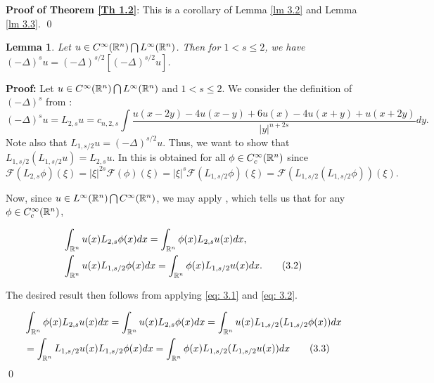 \documentclass{article}
\newtheorem{lemma}[theorem]{Lemma}
\newcommand{\rev}[1]{\textcolor{blue}{#1}}
\begin{document}
\noindent
\textbf{Proof of Theorem \ref{Th 1.2}}: This is a corollary of Lemma \ref{lm 3.2} and Lemma \ref{lm 3.3}. \qed

\begin{lemma}
\label{lm 3.1}
Let $u \in C^\infty(\mathbb{R}^n) \bigcap L^\infty(\mathbb{R}^n)$. Then for $ 1<s\le2$, we have $(-\Delta)^s u = (-\Delta)^{s/2} [(-\Delta)^{s/2}u]$.
\end{lemma}

\noindent
\textbf{Proof:} Let $u \in C^\infty(\mathbb{R}^n) \bigcap L^\infty(\mathbb{R}^n)$ and $1<s\le2$. We consider the definition of $(-\Delta)^s$ from \cite{powers}:
$$ (-\Delta)^s u = L_{2,s}u  =  c_{n,2,s}\int \frac{u(x-2y)-4u(x-y)+6u(x)-4u(x+y)+u(x+2y)}{|y|^{n+2s}}dy.$$
Note also that $L_{1,s/2}u = (-\Delta)^{s/2}u$. Thus, we want to show that  $L_{1,s/2}(L_{1,s/2}u) = L_{2, s}u$. In \cite[Thm 1.9]{powers} this is obtained for all $\phi \in C_c^\infty(\mathbb{R}^n)$ since
\begin{equation}
    \mathscr{F}(L_{2,s}\phi)(\xi) =|\xi|^{2s} \mathscr{F}(\phi)(\xi)= |\xi|^s  \mathscr{F}(L_{1,s/2}\phi )(\xi) = \mathscr{F}(L_{1,s/2}(L_{1,s/2}\phi))(\xi).
\tag{3.1} \label{eq: 3.1}
\end{equation} 

Now, since $u \in L^\infty(\mathbb{R}^n) \bigcap C^\infty(\mathbb{R}^n)$, we may apply \cite[Lemma 1.5]{powers}, which tells us that for any $\phi \in C_c^\infty(\mathbb{R}^n)$,

\begin{align*}
    & \int_{\mathbb{R}^n}u(x)L_{2,s}\phi(x)dx =  \int_{\mathbb{R}^n}\phi(x)L_{2,s}u(x)dx, \\
    & \int_{\mathbb{R}^n}u(x)L_{1,s/2}\phi(x)dx =  \int_{\mathbb{R}^n}\phi(x)L_{1,s/2}u(x)dx.
\tag{3.2} \label{eq: 3.2}
\end{align*}

The desired result then follows from applying \eqref{eq: 3.1} and \eqref{eq: 3.2}.

\begin{align*}
    & \int_{\mathbb{R}^n}\phi(x)L_{2,s}u(x)dx = \int_{\mathbb{R}^n}u(x)L_{2,s}\phi(x)dx = \int_{\mathbb{R}^n}u(x)L_{1,s/2}(L_{1,s/2}\phi(x))dx \\
    &= \int_{\mathbb{R}^n}L_{1,s/2}
    u(x)L_{1,s/2}\phi(x)dx = \int_{\mathbb{R}^n} \phi(x)L_{1,s/2}(L_{1,s/2}u(x))dx
\tag{3.3} \label{eq: 3.3}
\end{align*}
\qed


\end{document}
